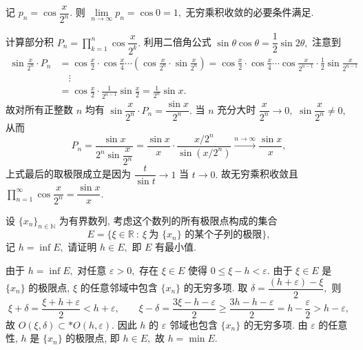 \begin{solution}
记 $p_n = \cos \dfrac{x}{2^n}.$ 则 $\lim\limits_{n \to \infty} p_n = \cos 0 = 1,$ 无穷乘积收敛的必要条件满足.

计算部分积 $P_n = \prod_{k=1}^n \cos \dfrac{x}{2^k}.$ 利用二倍角公式 $\sin\theta \cos\theta = \dfrac{1}{2}\sin 2\theta,$ 注意到
\begin{align*}
\sin\frac{x}{2^n} \cdot P_n
&= \cos\frac{x}{2} \cdot \cos\frac{x}{4} \cdots \left( \cos\frac{x}{2^n} \cdot \sin\frac{x}{2^n} \right)
= \cos\frac{x}{2} \cdot \cos\frac{x}{4} \cdots \cos\frac{x}{2^{n-1}} \cdot \frac{1}{2}\sin\frac{x}{2^{n-1}} \\
&\quad \vdots \\
&= \cos\frac{x}{2} \cdot \frac{1}{2^{n-1}}\sin\frac{x}{2} = \frac{1}{2^n}\sin x.
\end{align*}
故对所有正整数 $n$ 均有 $\sin\dfrac{x}{2^n} \cdot P_n = \dfrac{\sin x}{2^n}.$ 当 $n$ 充分大时 $\dfrac{x}{2^n} \to 0,$ $\sin\dfrac{x}{2^n} \neq 0,$ 从而
\[
P_n = \frac{\sin x}{2^n \sin\dfrac{x}{2^n}} = \frac{\sin x}{x} \cdot \frac{x/2^n}{\sin(x/2^n)} \xrightarrow[]{n\to\infty} \frac{\sin x}{x},
\]
上式最后的取极限成立是因为 $\dfrac{t}{\sin t} \to 1$ 当 $t \to 0.$ 故无穷乘积收敛且 $\prod_{n=1}^\infty \cos \dfrac{x}{2^n} = \dfrac{\sin x}{x}.$
\end{solution}


\begin{question}[points = 10]
设 $\{x_n\}_{n \in \mathbb{N}}$ 为有界数列, 考虑这个数列的所有极限点构成的集合
\[
E = \{ \xi \in \mathbb{R} ~:~ \xi ~ \text{为 $\{x_n\}$ 的某个子列的极限} \},
\]
记 $h = \inf E,$ 请证明 $h \in E,$ 即 $E$ 有最小值.

\end{question}

\begin{solution}
由于 $h = \inf E,$ 对任意 $\varepsilon > 0,$ 存在 $\xi \in E$ 使得 $0 \leqslant \xi - h < \varepsilon.$ 由于 $\xi \in E$ 是 $\{x_n\}$ 的极限点, $\xi$ 的任意邻域中包含 $\{x_n\}$ 的无穷多项. 取 $\delta = \dfrac{(h + \varepsilon) - \xi}{2},$ 则
\[
\xi + \delta = \frac{\xi + h + \varepsilon}{2} < h + \varepsilon, \qquad \xi - \delta = \frac{3\xi - h - \varepsilon}{2} \geqslant \frac{3h - h - \varepsilon}{2} = h - \frac{\varepsilon}{2} > h - \varepsilon,
\]
故 $O(\xi, \delta) \subset* O(h, \varepsilon).$ 因此 $h$ 的 $\varepsilon$ 邻域也包含 $\{x_n\}$ 的无穷多项. 由 $\varepsilon$ 的任意性, $h$ 是 $\{x_n\}$ 的极限点, 即 $h \in E,$ 故 $h = \min E.$
\end{solution}


